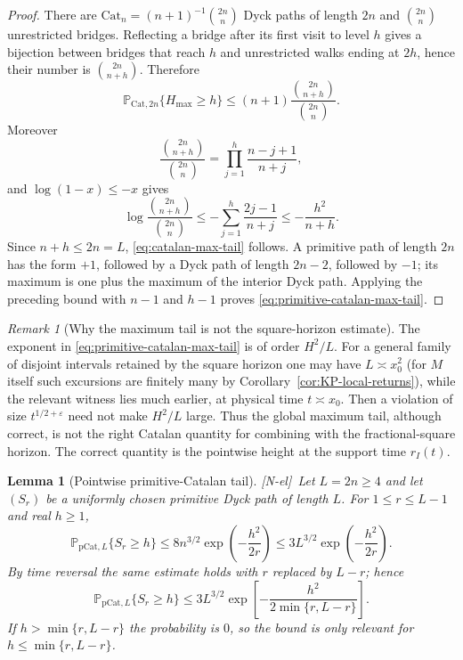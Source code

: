 \documentclass[11pt]{amsart}
\numberwithin{equation}{section}
\theoremstyle{plain}
\newtheorem{lemma}[theorem]{Lemma}
\theoremstyle{definition}
\theoremstyle{remark}
\newtheorem{remark}[theorem]{Remark}
\newcommand{\eps}{\varepsilon}
\newcommand{\tagNE}{\textup{[N-el]}}
\begin{document}
\begin{proof}
There are $\mathrm{Cat}_n=(n+1)^{-1}\binom{2n}{n}$ Dyck paths of length $2n$ and
$\binom{2n}{n}$ unrestricted bridges.  Reflecting a bridge after its first
visit to level $h$ gives a bijection between bridges that reach $h$ and
unrestricted walks ending at $2h$, hence their number is
$\binom{2n}{n+h}$.  Therefore
\[
 \mathbb P_{\mathrm{Cat},2n}\{H_{\max}\ge h\}
 \le (n+1)\frac{\binom{2n}{n+h}}{\binom{2n}{n}}.
\]
Moreover
\[
 \frac{\binom{2n}{n+h}}{\binom{2n}{n}}
 =\prod_{j=1}^h\frac{n-j+1}{n+j},
\]
and $\log(1-x)\le-x$ gives
\[
 \log\frac{\binom{2n}{n+h}}{\binom{2n}{n}}
 \le-\sum_{j=1}^h\frac{2j-1}{n+j}
 \le-\frac{h^2}{n+h}.
\]
Since $n+h\le2n=L$, \eqref{eq:catalan-max-tail} follows.  A primitive path
of length $2n$ has the form $+1$, followed by a Dyck path of length $2n-2$,
followed by $-1$; its maximum is one plus the maximum of the interior Dyck
path.  Applying the preceding bound with $n-1$ and $h-1$ proves
\eqref{eq:primitive-catalan-max-tail}.
\end{proof}

\begin{remark}[Why the maximum tail is not the square-horizon estimate]
\label{rem:max-tail-square-limit}
The exponent in \eqref{eq:primitive-catalan-max-tail} is of order
$H^2/L$.  For a general family of disjoint intervals retained by the
square horizon one may have $L\asymp x_0^2$ (for $M$ itself such excursions
are finitely many by Corollary~\ref{cor:KP-local-returns}), while the relevant witness lies much earlier, at physical
time $t\asymp x_0$.  Then a violation of size $t^{1/2+\eps}$ need not make
$H^2/L$ large.  Thus the global maximum tail, although correct, is not the
right Catalan quantity for combining with the fractional-square horizon.
The correct quantity is the pointwise height at the support time
$r_I(t)$.
\end{remark}

\begin{lemma}[Pointwise primitive-Catalan tail]
\label{lem:pointwise-catalan-tail}
\tagNE\ Let $L=2n\ge4$ and let $(S_r)$ be a uniformly chosen primitive Dyck path of
length $L$.  For $1\le r\le L-1$ and real $h\ge1$,
\begin{equation}
\label{eq:pointwise-catalan-tail-left}
 \mathbb P_{\mathrm{pCat},L}\{S_r\ge h\}
 \le 8n^{3/2}\exp\!\left(-\frac{h^2}{2r}\right)
 \le 3L^{3/2}\exp\!\left(-\frac{h^2}{2r}\right).
\end{equation}
By time reversal the same estimate holds with $r$ replaced by $L-r$;
hence
\begin{equation}
\label{eq:pointwise-catalan-tail-two-sided}
 \mathbb P_{\mathrm{pCat},L}\{S_r\ge h\}
 \le 3L^{3/2}
 \exp\!\left[-\frac{h^2}{2\min\{r,L-r\}}\right].
\end{equation}
If $h>\min\{r,L-r\}$ the probability is $0$, so the bound is only
relevant for $h\le\min\{r,L-r\}$.
\end{lemma}
\end{document}
